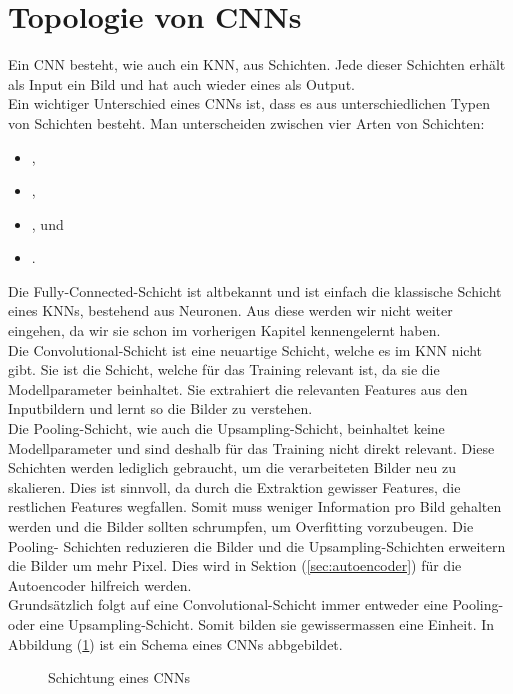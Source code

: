 \section{Topologie von CNNs}
Ein CNN besteht, wie auch ein KNN, aus Schichten. Jede dieser Schichten erhält
als Input ein Bild und hat auch wieder eines als Output. \\
Ein wichtiger Unterschied eines CNNs ist, dass es aus unterschiedlichen Typen von
Schichten besteht. Man unterscheiden zwischen vier Arten von Schichten:
\begin{itemize}
\item{,}
\item{,}
\item{, und}
\item{.}
\end{itemize}
Die Fully-Connected-Schicht ist altbekannt und ist einfach die klassische Schicht
eines KNNs, bestehend aus Neuronen. Aus diese werden wir nicht weiter eingehen,
da wir sie schon im vorherigen Kapitel kennengelernt haben. \\
Die Convolutional-Schicht ist eine neuartige Schicht, welche es im KNN nicht
gibt. Sie ist die Schicht, welche für das Training relevant ist,
da sie die Modellparameter beinhaltet. Sie extrahiert die relevanten Features
aus den Inputbildern und lernt so die Bilder zu verstehen. \\
Die Pooling-Schicht, wie auch die Upsampling-Schicht, beinhaltet keine
Modellparameter und sind deshalb für das Training nicht direkt relevant.
Diese Schichten werden lediglich gebraucht, um die verarbeiteten Bilder neu zu
skalieren. Dies ist sinnvoll, da durch die Extraktion gewisser Features, die
restlichen Features wegfallen. Somit muss weniger Information pro Bild gehalten
werden und die Bilder sollten schrumpfen, um Overfitting vorzubeugen. Die Pooling-
Schichten reduzieren die Bilder und die Upsampling-Schichten erweitern die
Bilder um mehr Pixel. Dies wird in Sektion (\ref{sec:autoencoder}) für die Autoencoder
hilfreich werden. \\
Grundsätzlich folgt auf eine Convolutional-Schicht immer entweder eine Pooling-
oder eine Upsampling-Schicht. Somit bilden sie gewissermassen eine Einheit.
\para{}
In Abbildung (\ref{fig:cnn_topology}) ist ein Schema eines CNNs abbgebildet.
\begin{figure}[h!]

  \caption{Schichtung eines CNNs}
  \label{fig:cnn_topology}
\end{figure}

